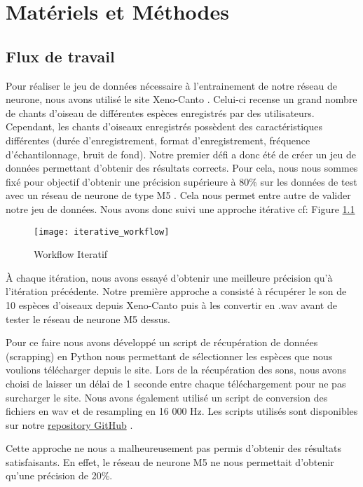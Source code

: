\chapter{Matériels et Méthodes}

\section{Flux de travail}

Pour réaliser le jeu de données nécessaire à l'entrainement de notre réseau de neurone,
nous avons utilisé le site Xeno-Canto \cite{XenoCanto}. Celui-ci recense un grand nombre de chants d'oiseau
de différentes espèces enregistrés par des utilisateurs.
Cependant, les chants d'oiseaux enregistrés possèdent des caractéristiques différentes (durée d'enregistrement,
format d'enregistrement, fréquence d'échantilonnage, bruit de fond).
Notre premier défi a donc été de créer un jeu de données permettant 
d'obtenir des résultats corrects. 
Pour cela, nous nous sommes fixé pour objectif d'obtenir une précision supérieure à 80\% sur les données de test
avec un réseau de neurone de type M5 \cite{M5}.
Cela nous permet entre autre de valider notre jeu de données. 
Nous avons donc suivi une approche itérative cf: Figure \ref{graph:iterative_workflow}

\begin{figure}[!ht]
  \texttt{[image: iterative\_workflow]}
  \centering
  \caption{Workflow Iteratif}
  \label{graph:iterative_workflow}
\end{figure}

À chaque itération, nous avons essayé d'obtenir une meilleure précision qu'à l'itération précédente.
Notre première approche a consisté à récupérer le son de 10 espèces d'oiseaux depuis Xeno-Canto puis
à les convertir en .wav avant de tester le réseau de neurone M5 dessus.

Pour ce faire nous avons développé un script de récupération de données (scrapping) en Python nous permettant de sélectionner les espèces 
que nous voulions télécharger depuis le site. Lors de la récupération des sons, nous avons choisi de laisser 
un délai de 1 seconde entre chaque téléchargement pour ne pas surcharger le site. Nous avons également utilisé un script 
de conversion des fichiers en wav et de resampling en 16 000 Hz. Les scripts utilisés sont disponibles sur
notre \href{https://github.com/SamiElkateb/embedded_ai_project}{repository GitHub} \cite{Repository}.

Cette approche ne nous a malheureusement pas permis d'obtenir des résultats satisfaisants. En effet, 
le réseau de neurone M5 ne nous permettait d'obtenir qu'une précision de 20\%.

